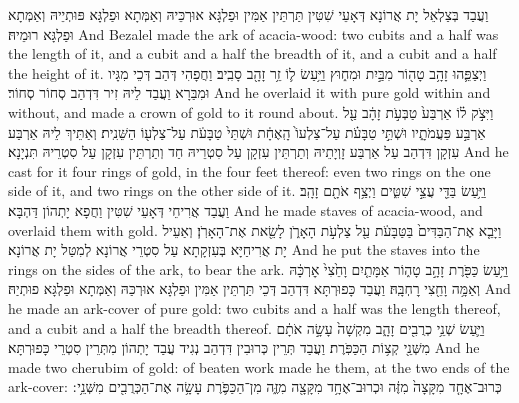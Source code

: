 {וַעֲבַד בְּצַלְאֵל יָת אֲרוֹנָא דְּאָעֵי שִׁטִּין תַּרְתֵּין אַמִּין וּפַלְגָּא אוּרְכֵּיהּ וְאַמְּתָא וּפַלְגָּא פּוּתְיֵיהּ וְאַמְּתָא וּפַלְגָּא רוּמֵיהּ׃}
{And Bezalel made the ark of acacia-wood: two cubits and a half was the length of it, and a cubit and a half the breadth of it, and a cubit and a half the height of it.}{}
{וַיְצַפֵּ֛הוּ זָהָ֥ב טָה֖וֹר מִבַּ֣יִת וּמִח֑וּץ וַיַּ֥עַשׂ ל֛וֹ זֵ֥ר זָהָ֖ב סָבִֽיב׃}
{וַחֲפָהִי דְּהַב דְּכֵי מִגָּיו וּמִבַּרָא וַעֲבַד לֵיהּ זִיר דִּדְהַב סְחוֹר סְחוֹר׃}
{And he overlaid it with pure gold within and without, and made a crown of gold to it round about.}{}
{וַיִּצֹ֣ק ל֗וֹ אַרְבַּע֙ טַבְּעֹ֣ת זָהָ֔ב עַ֖ל אַרְבַּ֣ע פַּעֲמֹתָ֑יו וּשְׁתֵּ֣י טַבָּעֹ֗ת עַל־צַלְעוֹ֙ הָֽאֶחָ֔ת וּשְׁתֵּי֙ טַבָּעֹ֔ת עַל־צַלְע֖וֹ הַשֵּׁנִֽית׃}
{וְאַתֵּיךְ לֵיהּ אַרְבַּע עִזְקָן דִּדְהַב עַל אַרְבַּע זָוְיָתֵיהּ וְתַרְתֵּין עִזְקָן עַל סִטְרֵיהּ חַד וְתַרְתֵּין עִזְקָן עַל סִטְרֵיהּ תִּנְיָנָא׃}
{And he cast for it four rings of gold, in the four feet thereof: even two rings on the one side of it, and two rings on the other side of it.}{}
{וַיַּ֥עַשׂ בַּדֵּ֖י עֲצֵ֣י שִׁטִּ֑ים וַיְצַ֥ף אֹתָ֖ם זָהָֽב׃}
{וַעֲבַד אֲרִיחֵי דְּאָעֵי שִׁטִּין וַחֲפָא יָתְהוֹן דַּהְבָּא׃}
{And he made staves of acacia-wood, and overlaid them with gold.}{}
{וַיָּבֵ֤א אֶת־הַבַּדִּים֙ בַּטַּבָּעֹ֔ת עַ֖ל צַלְעֹ֣ת הָאָרֹ֑ן לָשֵׂ֖את אֶת־הָאָרֹֽן׃}
{וְאַעֵיל יָת אֲרִיחַיָּא בְּעִזְקָתָא עַל סִטְרֵי אֲרוֹנָא לְמִטַּל יָת אֲרוֹנָא׃}
{And he put the staves into the rings on the sides of the ark, to bear the ark.}{}
{וַיַּ֥עַשׂ כַּפֹּ֖רֶת זָהָ֣ב טָה֑וֹר אַמָּתַ֤יִם וָחֵ֙צִי֙ אׇרְכָּ֔הּ וְאַמָּ֥ה וָחֵ֖צִי רׇחְבָּֽהּ׃}
{וַעֲבַד כָּפוּרְתָּא דִּדְהַב דְּכֵי תַּרְתֵּין אַמִּין וּפַלְגָּא אוּרְכַּהּ וְאַמְּתָא וּפַלְגָּא פוּתְיַהּ׃}
{And he made an ark-cover of pure gold: two cubits and a half was the length thereof, and a cubit and a half the breadth thereof.}{}
{וַיַּ֛עַשׂ שְׁנֵ֥י כְרֻבִ֖ים זָהָ֑ב מִקְשָׁה֙ עָשָׂ֣ה אֹתָ֔ם מִשְּׁנֵ֖י קְצ֥וֹת הַכַּפֹּֽרֶת׃}
{וַעֲבַד תְּרֵין כְּרוּבִין דִּדְהַב נְגִיד עֲבַד יָתְהוֹן מִתְּרֵין סִטְרֵי כָּפוּרְתָּא׃}
{And he made two cherubim of gold: of beaten work made he them, at the two ends of the ark-cover:}{}
{כְּרוּב־אֶחָ֤ד מִקָּצָה֙ מִזֶּ֔ה וּכְרוּב־אֶחָ֥ד מִקָּצָ֖ה מִזֶּ֑ה מִן־הַכַּפֹּ֛רֶת עָשָׂ֥ה אֶת־הַכְּרֻבִ֖ים מִשְּׁנֵ֥י ׃}
